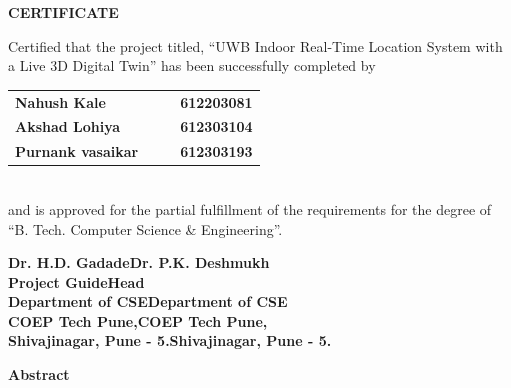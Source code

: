 \documentclass[a4paper,12pt,onecolumn]{report}
\begin{document}
\vspace{12pt}
\begin{center}
\Large{\bf{CERTIFICATE\\}}
\end{center}
\vspace{12pt}

\linespread{1.5}\selectfont
\large{
Certified that the project titled, ``UWB Indoor Real-Time Location System with a
Live 3D Digital Twin'' has been successfully completed by \\
\begin{table}[htbp]
    \begin{center}
    \begin{tabular}{ l c c l }
    \Large\bf{Nahush Kale} & & & \Large\bf{612203081} \\ [0.3cm]
    \Large\bf{Akshad Lohiya} & & & \Large\bf{612303104} \\ [0.3cm]
    \Large\bf{Purnank vasaikar} & & & \Large\bf{612303193} \\ [0.3cm]
    \end{tabular}
    \end{center}
\end{table} \\
and is approved for the partial fulfillment of the requirements for the degree of
``B. Tech. Computer Science \& Engineering''.
}

\vspace{30pt}
\begin{center}
\normalsize{\bf{Dr. H.D. GadadeDr. P.K. Deshmukh\\
Project GuideHead}\\
Department of CSEDepartment of CSE\\
COEP Tech Pune,COEP Tech Pune,\\
Shivajinagar, Pune - 5.Shivajinagar, Pune - 5.}
\end{center}

\newpage
\begin{center}
\Large \textbf{Abstract}
\end{center}
\end{document}
